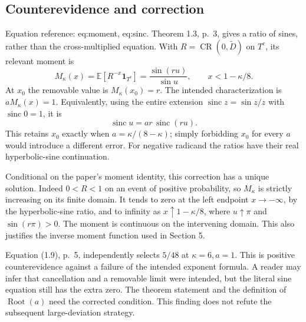 \documentclass[10pt]{article}
\begin{document}
\subsection*{Counterevidence and correction}
Equation reference: eq:moment, eq:sinc. Theorem 1.3, p. 3, gives a ratio of sines, rather than the cross-multiplied equation. With \(R=\operatorname{CR}(0,\widetilde D)\) on \(T^c\), its relevant moment is \[
 M_\kappa(x)=\mathbb E[R^{-x}\mathbf1_{T^c}]
 =\frac{\sin(ru)}{\sin u},\qquad x<1-\kappa/8.\] At \(x_0\) the removable value is \(M_\kappa(x_0)=r\). The intended characterization is \(aM_\kappa(x)=1\). Equivalently, using the entire extension \(\operatorname{sinc}z=\sin z/z\) with \(\operatorname{sinc}0=1\), it is \[
 \operatorname{sinc}u=ar\,\operatorname{sinc}(ru).\] This retains \(x_0\) exactly when \(a=\kappa/(8-\kappa)\); simply forbidding \(x_0\) for every \(a\) would introduce a different error. For negative radicand the ratios have their real hyperbolic-sine continuation.\par
Conditional on the paper’s moment identity, this correction has a unique solution. Indeed \(0<R<1\) on an event of positive probability, so \(M_\kappa\) is strictly increasing on its finite domain. It tends to zero at the left endpoint \(x\to-\infty\), by the hyperbolic-sine ratio, and to infinity as \(x\uparrow1-\kappa/8\), where \(u\uparrow\pi\) and \(\sin(r\pi)>0\). The moment is continuous on the intervening domain. This also justifies the inverse moment function used in Section 5.\par
Equation (1.9), p. 5, independently selects \(5/48\) at \(\kappa=6,a=1\). This is positive counterevidence against a failure of the intended exponent formula. A reader may infer that cancellation and a removable limit were intended, but the literal sine equation still has the extra zero. The theorem statement and the definition of \(\operatorname{Root}(a)\) need the corrected condition. This finding does not refute the subsequent large-deviation strategy.\par
\end{document}
